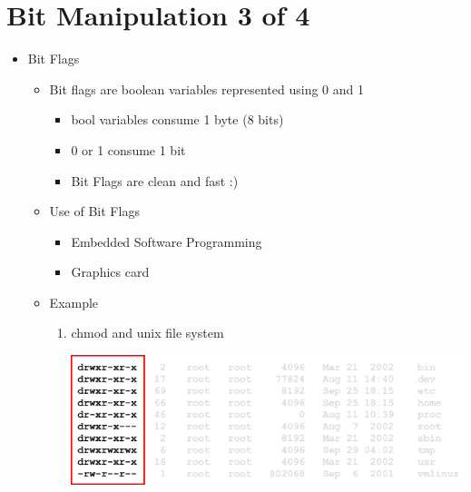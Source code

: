 \documentclass[12pt]{article}
\begin{document}
\bigskip

\section*{Bit Manipulation 3 of 4}

\bigskip

\begin{itemize}
    \item Bit Flags
    \begin{itemize}
        \item Bit flags are boolean variables represented using 0 and 1
        \begin{itemize}
            \item bool variables consume 1 byte (8 bits)
            \item 0 or 1 consume 1 bit
            \item Bit Flags are clean and fast :)
        \end{itemize}
        \item Use of Bit Flags
        \begin{itemize}
            \item Embedded Software Programming
            \item Graphics card
        \end{itemize}
        \item Example
        \begin{enumerate}[1.]
            \item chmod and unix file system

            \begin{center}
            \includegraphics[width=\linewidth]{images/week_9_notes_3_1.png}
            \end{center}

        \end{enumerate}
    \end{itemize}
\end{itemize}
\end{document}
